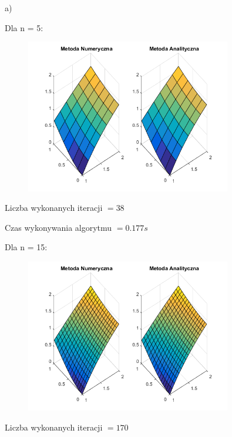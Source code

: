 a)

Dla n = 5:

\begin{figure}[!ht]
	\begin{center}
		\includegraphics[width=0.8\textwidth]{Lab6/charts/jacobi/zad1/5.png}
	\end{center}
\end{figure}

Liczba wykonanych iteracji $ = 38 $

Czas wykonywania algorytmu $ = 0.177 s$

\newpage

Dla n = 15:

\begin{figure}[!ht]
	\begin{center}
		\includegraphics[width=0.8\textwidth]{Lab6/charts/jacobi/zad1/15.png}
	\end{center}
\end{figure}


Liczba wykonanych iteracji $ = 170 $

